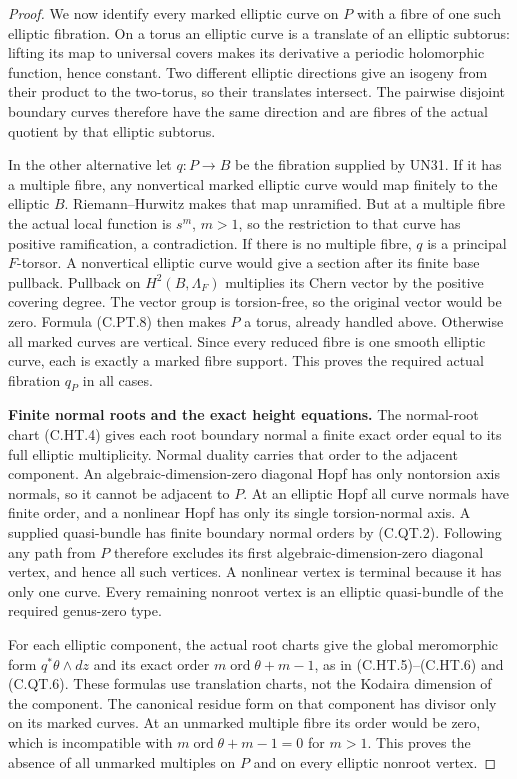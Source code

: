 \begin{proof}
We now identify every marked elliptic curve on $P$
with a fibre of one such elliptic fibration.
On a torus an elliptic curve is a translate of an
elliptic subtorus: lifting its map to universal
covers makes its derivative a periodic holomorphic
function, hence constant. Two different elliptic
directions give an isogeny from their product to
the two-torus, so their translates intersect.
The pairwise disjoint boundary curves therefore
have the same direction and are fibres of the
actual quotient by that elliptic subtorus.

In the other alternative let $q:P\to B$ be the
fibration supplied by UN31. If it has a multiple
fibre, any nonvertical marked elliptic curve would
map finitely to the elliptic $B$. Riemann--Hurwitz
makes that map unramified. But at a multiple fibre
the actual local function is $s^m$, $m>1$,
so the restriction to that curve has positive
ramification, a contradiction.
If there is no multiple fibre, $q$ is a principal
$F$-torsor. A nonvertical elliptic curve would give
a section after its finite base pullback. Pullback
on $H^2(B,\Lambda_F)$ multiplies its Chern vector
by the positive covering degree. The vector group
is torsion-free, so the original vector would be
zero. Formula (C.PT.8) then makes $P$ a torus,
already handled above. Otherwise all marked
curves are vertical. Since every reduced fibre
is one smooth elliptic curve, each is exactly
a marked fibre support. This proves the required
actual fibration $q_P$ in all cases.

\par\medskip\noindent\textbf{Finite normal roots and the exact height equations.}
The normal-root chart (C.HT.4) gives each root
boundary normal a finite exact order equal to its
full elliptic multiplicity. Normal duality carries
that order to the adjacent component.
An algebraic-dimension-zero diagonal Hopf has only
nontorsion axis normals, so it cannot be adjacent
to $P$. At an elliptic Hopf all curve normals have
finite order, and a nonlinear Hopf has only its
single torsion-normal axis. A supplied quasi-bundle
has finite boundary normal orders by (C.QT.2).
Following any path from $P$ therefore excludes
its first algebraic-dimension-zero diagonal
vertex, and hence all such vertices. A nonlinear
vertex is terminal because it has only one curve.
Every remaining nonroot vertex is an elliptic
quasi-bundle of the required genus-zero type.

For each elliptic component, the actual root
charts give the global meromorphic form
$q^*\theta\wedge dz$ and its exact order
$m\operatorname{ord}\theta+m-1$, as in
(C.HT.5)--(C.HT.6) and (C.QT.6). These formulas
use translation charts, not the Kodaira dimension
of the component. The canonical residue form
on that component has divisor only on its
marked curves. At an unmarked multiple fibre
its order would be zero, which is incompatible
with $m\operatorname{ord}\theta+m-1=0$ for
$m>1$. This proves the absence of all unmarked
multiples on $P$ and on every elliptic nonroot
vertex.


\end{proof}
